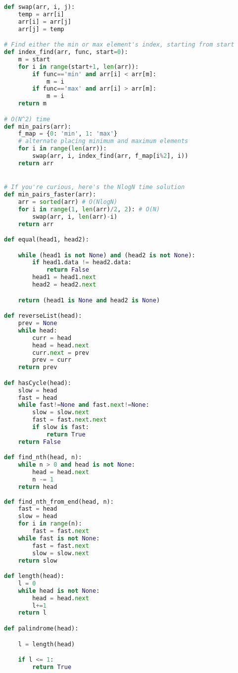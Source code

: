 \documentclass{article}
\begin{document}
\begin{lstlisting}[language=Python]
def swap(arr, i, j):
    temp = arr[i]
    arr[i] = arr[j]
    arr[j] = temp

# Find either the min or max element's index, starting from start
def index_find(arr, func, start=0):
    m = start
    for i in range(start+1, len(arr)):
        if func=='min' and arr[i] < arr[m]:
            m = i
        if func=='max' and arr[i] > arr[m]:
            m = i
    return m

# O(N^2) time
def min_pairs(arr):
    f_map = {0: 'min', 1: 'max'}
    # alternate placing minimum and maximum elements
    for i in range(len(arr)):
        swap(arr, i, index_find(arr, f_map[i%2], i))
    return arr


# If you're curious, here's the NlogN time solution
def min_pairs_faster(arr):
    arr = sorted(arr) # O(NlogN)
    for i in range(1, len(arr)/2, 2): # O(N)
        swap(arr, i, len(arr)-i)
    return arr

def equal(head1, head2):

    while (head1 is not None) and (head2 is not None):
        if head1.data != head2.data:
            return False
        head1 = head1.next
        head2 = head2.next

    return (head1 is None and head2 is None)

def reverseList(head):
    prev = None
    while head:
        curr = head
        head = head.next
        curr.next = prev
        prev = curr
    return prev

def hasCycle(head):
    slow = head
    fast = head
    while fast!=None and fast.next!=None:
        slow = slow.next
        fast = fast.next.next
        if slow is fast:
            return True
    return False

def find_nth(head, n):
    while n > 0 and head is not None:
        head = head.next
        n -= 1
    return head
    
def find_nth_from_end(head, n):
    fast = head
    slow = head
    for i in range(n):
        fast = fast.next
    while fast is not None:
        fast = fast.next
        slow = slow.next
    return slow

def length(head):
    l = 0
    while head is not None:
        head = head.next
        l+=1
    return l

def palindrome(head):

    l = length(head)

    if l <= 1:
        return True


\end{lstlisting}
\end{document}
